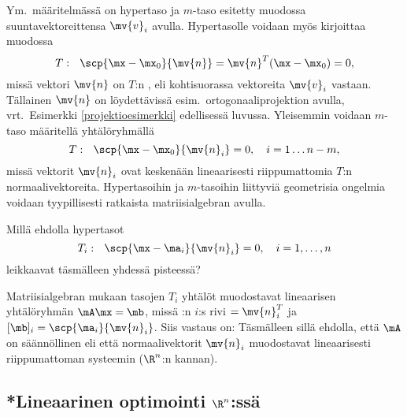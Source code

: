 Ym.\ määritelmässä on hypertaso ja $m$-taso esitetty
%
 muodossa suuntavektoreittensa $\mv{v}_i$ avulla. Hypertasolle voidaan myös
kirjoittaa  muodossa
\[ 
T:\ \ \scp{\mx-\mx_0}{\mv{n}} = \mv{n}^T(\mx-\mx_0) = 0, 
\]
missä vektori $\mv{n}$ on $T$:n
%
, eli kohtisuorassa vektoreita $\mv{v}_i$ vastaan.
Tällainen $\mv{n}$ on löydettävissä esim.\ ortogonaaliprojektion avulla, vrt.\ Esimerkki 
\ref{projektioesimerkki} edellisessä luvussa. Yleisemmin voidaan $m$-taso määritellä 
yhtälöryhmällä
\[ 
T:\ \ \scp{\mx-\mx_0}{\mv{n}_i} = 0, \quad i = 1 \ldots n-m, 
\]
missä vektorit $\mv{n}_i$ ovat keskenään lineaarisesti riippumattomia $T$:n normaalivektoreita.
Hypertasoihin ja $m$-tasoihin liittyviä geometrisia ongelmia voidaan tyypillisesti ratkaista 
matriisialgebran avulla.
\begin{Exa} Millä ehdolla hypertasot
\[ 
T_i:\ \ \scp{\mx-\ma_i}{\mv{n}_i} = 0, \quad i = 1, \ldots, n 
\]
leikkaavat täsmälleen yhdessä pisteessä? 
\end{Exa}
\ratk Matriisialgebran mukaan tasojen $T_i$ yhtälöt muodostavat lineaarisen yhtälöryhmän 
$\mA\mx = \mb$, missä \mA:n $i$:s rivi $= \mv{n}_i^T$ ja $[\mb]_i = \scp{\ma_i}{\mv{n}_i}$. 
Siis vastaus on: Täsmälleen sillä ehdolla, että $\mA$ on säännöllinen eli että normaalivektorit
$\mv{n}_i$ muodostavat lineaarisesti riippumattoman systeemin ($\R^n$:n kannan). \loppu  

\subsection*{*Lineaarinen optimointi $\R^n$:ssä}
 

